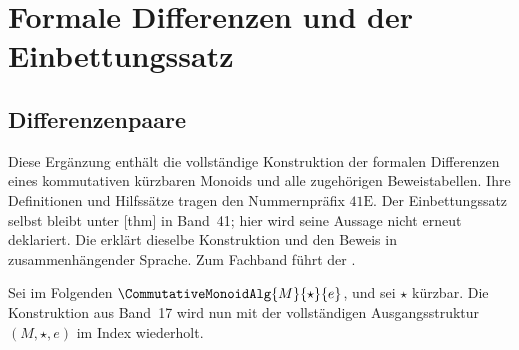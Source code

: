 \chapter{Formale Differenzen und der Einbettungssatz}

\section{Differenzenpaare}

Diese Ergänzung enthält die vollständige Konstruktion der formalen
Differenzen eines kommutativen kürzbaren Monoids und alle zugehörigen
Beweistabellen. Ihre Definitionen und Hilfssätze tragen den Nummernpräfix
\(41\mathrm E\). Der Einbettungssatz selbst bleibt unter
[thm] in Band~41;
hier wird seine Aussage nicht erneut deklariert.
Die \DifferencesReadingLink{} erklärt dieselbe Konstruktion und den Beweis
in zusammenhängender Sprache. Zum Fachband führt der \DifferencesMainLink{}.

Sei im Folgenden \(\CommutativeMonoidAlg{M}{\star}{e}\), und sei
\(\star\) kürzbar. Die Konstruktion aus Band~17 wird nun mit der
vollständigen Ausgangsstruktur \((M,\star,e)\) im Index wiederholt.

\hypertarget{differences.statement.GroupCompletionPairCarrier}{}

\hypertarget{differences.statement.GroupCompletionPairRelationDef}{}

